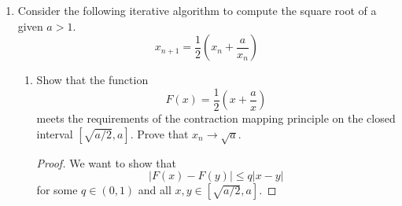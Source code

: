 \documentclass[../psets.tex]{subfiles}
\begin{document}
\begin{enumerate}
\begin{enumerate}
\begin{proof}
\begin{align*}
            \end{align*}
            as desired.
        \end{proof}
    \end{enumerate}
    \item Consider the following iterative algorithm to compute the square root of a given $a>1$.
    \begin{equation*}
        x_{n+1} = \frac{1}{2}\left( x_n+\frac{a}{x_n} \right)
    \end{equation*}
    \begin{enumerate}
        \item Show that the function
        \begin{equation*}
            F(x) = \frac{1}{2}\left( x+\frac{a}{x} \right)
        \end{equation*}
        meets the requirements of the contraction mapping principle on the closed interval $[\sqrt{a/2},a]$. Prove that $x_n\to\sqrt{a}$.
        \begin{proof}
            We want to show that
            \begin{equation*}
                |F(x)-F(y)| \leq q|x-y|
            \end{equation*}
            for some $q\in(0,1)$ and all $x,y\in[\sqrt{a/2},a]$.


\end{proof}
\end{enumerate}
\end{enumerate}
\end{document}
